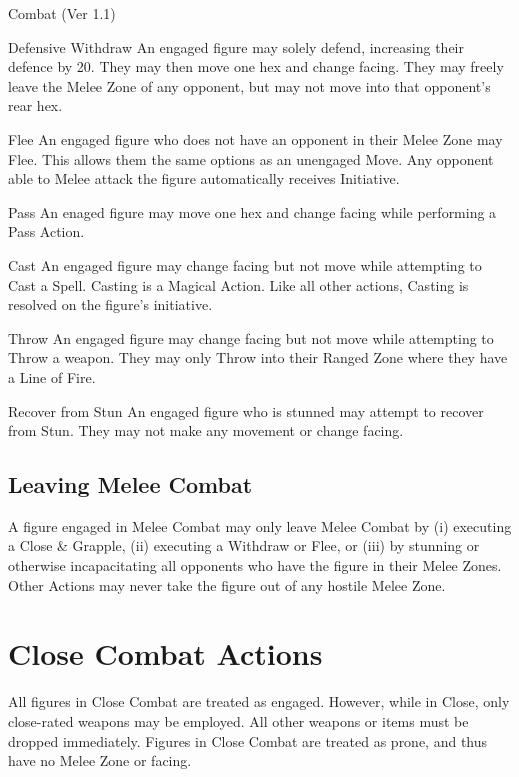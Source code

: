 \begin{Chapter}{Combat (Ver 1.1)}
\begin{Description}
\item[Defensive Withdraw] An engaged figure may solely defend,
  increasing their defence by 20. They may then move one hex and
  change facing.  They may freely leave the Melee Zone of any
  opponent, but may not move into that opponent’s rear hex.

\item[Flee] An engaged figure who does not have an opponent in their
  Melee Zone may Flee.  This allows them the same options as an
  unengaged Move.  Any opponent able to Melee attack the figure
  automatically receives Initiative.

\item[Pass] An enaged figure may move one hex and change facing while
  performing a Pass Action.

\item[Cast] An engaged figure may change facing but not move while
  attempting to Cast a Spell. Casting is a Magical Action.  Like all
  other actions, Casting is resolved on the figure’s initiative.

\item[Throw]An engaged figure may change facing but not move while
  attempting to Throw a weapon.  They may only Throw into their Ranged
  Zone where they have a Line of Fire.

\item[Recover from Stun] An engaged figure who is stunned may attempt
  to recover from Stun.  They may not make any movement or change
  facing.

\end{Description}

\subsection{Leaving Melee Combat}

A figure engaged in Melee Combat may only leave Melee Combat by (i)
executing a Close \& Grapple, (ii) executing a Withdraw or Flee, or
(iii) by stunning or otherwise incapacitating all opponents who have
the figure in their Melee Zones.  Other Actions may never take the
figure out of any hostile Melee Zone.

\section{Close Combat Actions}
\label{combat:close}

All figures in Close Combat are treated as engaged.  However, while in
Close, only close-rated weapons may be employed. All other weapons or
items must be dropped immediately. Figures in Close Combat are treated
as prone, and thus have no Melee Zone or facing.


\end{Chapter}
